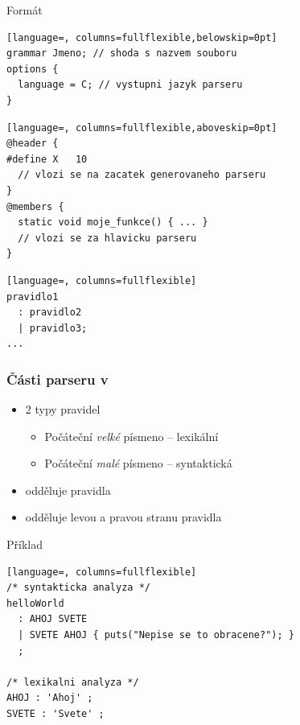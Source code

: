 \begin{frame}[fragile]{Formát \ant}

  \begin{lstlisting}[language=, columns=fullflexible,belowskip=0pt]
grammar Jmeno; // shoda s nazvem souboru
options {
  language = C; // vystupni jazyk parseru
}
  \end{lstlisting}
  \pause
  \begin{lstlisting}[language=, columns=fullflexible,aboveskip=0pt]
@header {
#define X	10
  // vlozi se na zacatek generovaneho parseru
}
@members {
  static void moje_funkce() { ... }
  // vlozi se za hlavicku parseru
}
  \end{lstlisting}
  \pause
  \begin{lstlisting}[language=, columns=fullflexible]
pravidlo1
  : pravidlo2
  | pravidlo3;
...
  \end{lstlisting}

\end{frame}

\begin{frame}[fragile]
  \frametitle{Části parseru v \ant}

  \begin{itemize}
    \item 2 typy pravidel
    \begin{itemize}
      \item Počáteční \emph{velké} písmeno -- lexikální
      \item Počáteční \emph{malé} písmeno -- syntaktická
    \end{itemize}

    \pause

    \item \code{;} odděluje pravidla

    \pause

    \item \code{:} odděluje levou a pravou stranu pravidla
  \end{itemize}


  \begin{block}{Příklad}
  \begin{lstlisting}[language=, columns=fullflexible]
/* syntakticka analyza */
helloWorld
  : AHOJ SVETE
  | SVETE AHOJ { puts("Nepise se to obracene?"); }
  ;

/* lexikalni analyza */
AHOJ : 'Ahoj' ;
SVETE : 'Svete' ;
  \end{lstlisting}
  \end{block}

\end{frame}

